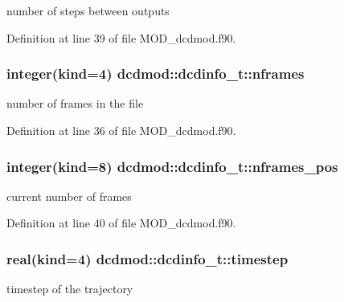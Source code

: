 number of steps between outputs 



Definition at line 39 of file M\-O\-D\-\_\-dcdmod.\-f90.

\hypertarget{structdcdmod_1_1dcdinfo__t_a2d3ab18a0c6c096cdf2391597303ed7f}{
\subsubsection[{nframes}]{\setlength{\rightskip}{0pt plus 5cm}integer(kind=4) dcdmod\-::dcdinfo\-\_\-t\-::nframes}}\label{structdcdmod_1_1dcdinfo__t_a2d3ab18a0c6c096cdf2391597303ed7f}


number of frames in the file 



Definition at line 36 of file M\-O\-D\-\_\-dcdmod.\-f90.

\hypertarget{structdcdmod_1_1dcdinfo__t_a5ec4a2f171f3cb7b8eec4b8ea8a22411}{
\subsubsection[{nframes\-\_\-pos}]{\setlength{\rightskip}{0pt plus 5cm}integer(kind=8) dcdmod\-::dcdinfo\-\_\-t\-::nframes\-\_\-pos}}\label{structdcdmod_1_1dcdinfo__t_a5ec4a2f171f3cb7b8eec4b8ea8a22411}


current number of frames 



Definition at line 40 of file M\-O\-D\-\_\-dcdmod.\-f90.

\hypertarget{structdcdmod_1_1dcdinfo__t_a02d43fa6b812b5613e723f119d48887d}{
\subsubsection[{timestep}]{\setlength{\rightskip}{0pt plus 5cm}real(kind=4) dcdmod\-::dcdinfo\-\_\-t\-::timestep}}\label{structdcdmod_1_1dcdinfo__t_a02d43fa6b812b5613e723f119d48887d}


timestep of the trajectory 



